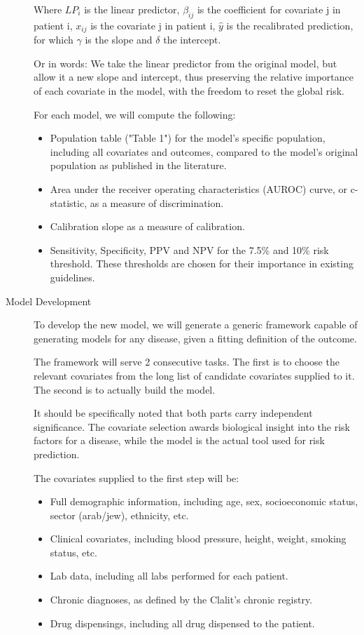 \documentclass[a4paper,12pt]{article}
\begin{document}
\begin{description}
		Where $ LP_i $ is the linear predictor, $ \beta_{ij} $ is the coefficient for covariate j in patient i, $ x_{ij} $ is the covariate j in patient i, $ \hat{y} $ is the recalibrated prediction, for which $ \gamma $ is the slope and $ \delta $ the intercept.
		
		Or in words: We take the linear predictor from the original model, but allow it a new slope and intercept, thus preserving the relative importance of each covariate in the model, with the freedom to reset the global risk.
		
		For each model, we will compute the following\cite{Steyerberg2008}:
		\begin{itemize}
			\item Population table ("Table 1") for the model's specific population, including all covariates and outcomes, compared to the model's original population as published in the literature.
			\item Area under the receiver operating characteristics (AUROC) curve, or c-statistic, as a measure of discrimination.
			\item Calibration slope as a measure of calibration.
			\item Sensitivity, Specificity, PPV and NPV for the 7.5\% and 10\% risk threshold. These thresholds are chosen for their importance in existing guidelines\cite{Goff2014,Bibbins-Domingo2016}.
		\end{itemize}
		
		\item[Model Development] To develop the new model, we will generate a generic framework capable of generating models for any disease, given a fitting definition of the outcome.
		
		The framework will serve 2 consecutive tasks. The first is to choose the relevant covariates from the long list of candidate covariates supplied to it. The second is to actually build the model.
		
		It should be specifically noted that both parts carry independent significance. The covariate selection awards biological insight into the risk factors for a disease, while the model is the actual tool used for risk prediction.
		
		The covariates supplied to the first step will be: 
		\begin{itemize}
			\item Full demographic information, including age, sex, socioeconomic status, sector (arab/jew), ethnicity, etc.
			\item Clinical covariates, including blood pressure, height, weight, smoking status, etc.
			\item Lab data, including all labs performed for each patient.
			\item Chronic diagnoses, as defined by the Clalit's chronic registry\cite{Rennert2001}.
			\item Drug dispensings, including all drug dispensed to the patient.
		\end{itemize}
	

\end{description}
\end{document}
